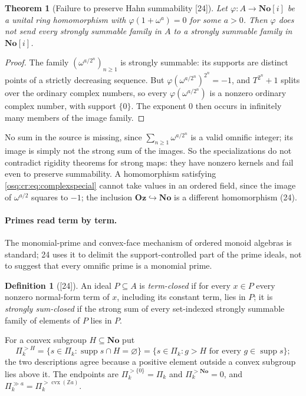 \documentclass[11pt,letterpaper]{article}
\numberwithin{equation}{section}
\newtheorem{theorem}{Theorem}[section]
\theoremstyle{definition}
\newtheorem{definition}[definition]{Definition}
\theoremstyle{remark}
\theoremstyle{plain}
\newcommand{\No}{\mathbf{No}}
\newcommand{\Oz}{\mathbf{Oz}}
\newcommand{\SC}{\No[i]}
\newcommand{\Z}{\mathbb Z}
\newcommand{\supp}{\operatorname{supp}}
\newcommand{\src}[1]{\textup{\textsf{[#1]}}}
\begin{document}
\begin{theorem}[Failure to preserve Hahn summability \src{24}]\label{osq:cr:thm:nonstrong}
Let $\varphi:A\to\SC$ be a unital ring homomorphism with $\varphi(1+\omega^a)=0$ for some $a>0$. Then $\varphi$ does not send every strongly summable
family in $A$ to a strongly summable family in $\SC$.
\end{theorem}
\begin{proof}
The family $(\omega^{a/2^n})_{n\ge1}$ is strongly summable: its supports are distinct points of a strictly decreasing sequence. But
$\varphi(\omega^{a/2^n})^{2^n}=-1$, and $T^{2^n}+1$ splits over the ordinary complex numbers, so every $\varphi(\omega^{a/2^n})$ is a nonzero ordinary
complex number, with
support $\{0\}$. The exponent $0$ then occurs in infinitely many members of the image family.
\end{proof}

No sum in the source is missing, since $\sum_{n\ge1}\omega^{a/2^n}$ is a valid omnific integer; its image is simply not the strong sum of the images. So the specializations
do not contradict rigidity theorems for strong maps: they have nonzero kernels and fail even to preserve summability. A homomorphism satisfying
\eqref{osq:cr:eq:complexspecial} cannot take values in an ordered field, since the image of $\omega^{a/2}$ squares to $-1$; the inclusion
$\Oz\hookrightarrow\No$ is a different homomorphism (24).

\paragraph{Primes read term by term.} The monomial-prime and convex-face mechanism of ordered monoid algebras is standard; 24 uses it to delimit the
support-controlled part of the prime ideals, not to suggest that every omnific prime is a monomial prime.

\begin{definition}[\src{24}]\label{osq:cr:def:termclosed}
An ideal $P\subseteq A$ is \emph{term-closed} if for every $x\in P$ every nonzero normal-form term of $x$, including its constant term, lies in $P$; it
is \emph{strongly sum-closed} if the strong sum of every set-indexed strongly summable family of elements of $P$ lies in $P$.
\end{definition}

For a convex subgroup $H\subseteq\No$ put
\begin{equation}\label{osq:cr:eq:PH}
 \Pi_k^{>H}=\{s\in\Pi_k:\supp s\cap H=\varnothing\}=\{s\in\Pi_k:g>H\text{ for every }g\in\supp s\};
\end{equation}
the two descriptions agree because a positive element outside a convex subgroup lies above it. The endpoints are $\Pi_k^{>\{0\}}=\Pi_k$ and
$\Pi_k^{>\No}=0$, and $\Pi_k^{\gg a}=\Pi_k^{>\operatorname{cvx}(\Z a)}$.
\end{document}

